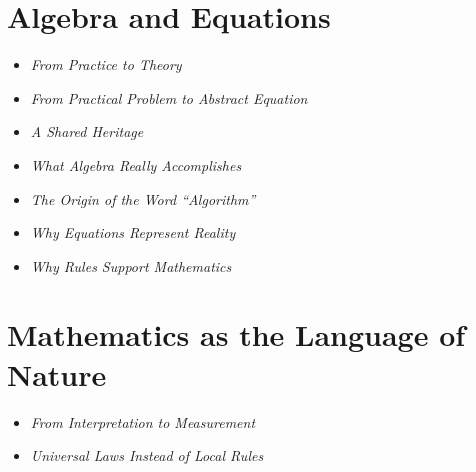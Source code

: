 \section{Algebra and Equations}
\begin{HistoryBox}
	
	\begin{itemize}
		\item \emph{From Practice to Theory}\dotfill \pageref{box:practice}
		\item \emph{From Practical Problem to Abstract Equation}\dotfill \pageref{box:abstractequation}
	\end{itemize}
\end{HistoryBox}

\begin{NoteBox}
	
	\begin{itemize}
		\item \emph{A Shared Heritage}\dotfill \pageref{box:heritage}
		\item \emph{What Algebra Really Accomplishes}\dotfill \pageref{box:generalform}
	\end{itemize}
\end{NoteBox}

\begin{DidacticBox}
	\begin{itemize}
		\item \emph{The Origin of the Word ``Algorithm''}\dotfill \pageref{box:origin}
		\item \emph{Why Equations Represent Reality}\dotfill \pageref{box:reality}
		\item \emph{Why Rules Support Mathematics}\dotfill \pageref{box:rules}
	\end{itemize}
\end{DidacticBox}

\section{Mathematics as the Language of Nature}
\begin{HistoryBox}
	
	\begin{itemize}
		\item \emph{From Interpretation to Measurement}\dotfill \pageref{box:measurement}
		\item \emph{Universal Laws Instead of Local Rules}\dotfill \pageref{box:laws}
	\end{itemize}
\end{HistoryBox}

